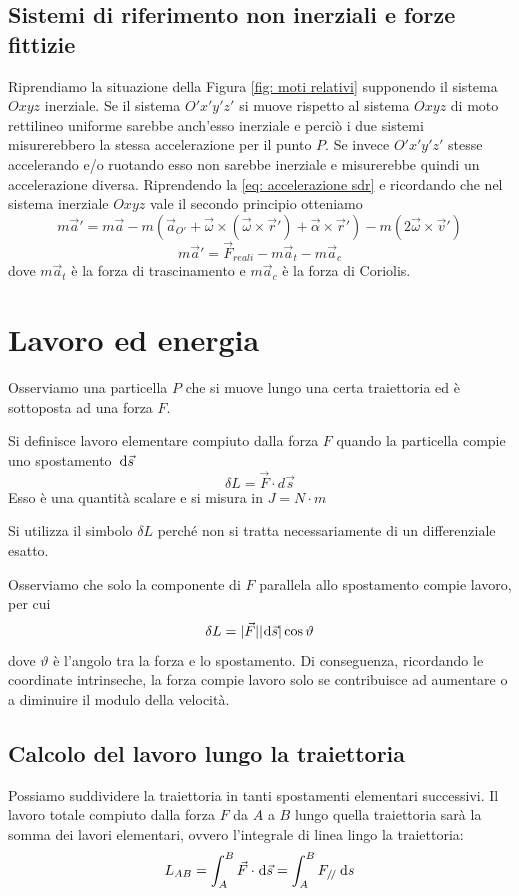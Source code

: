\documentclass{article}
\theoremstyle{plain}
\begin{document}
\subsection{Sistemi di riferimento non inerziali e forze fittizie}
Riprendiamo la situazione della Figura \ref{fig: moti relativi} supponendo il sistema $Oxyz$ inerziale. Se il sistema $O'x'y'z'$ si muove rispetto al sistema $Oxyz$ di moto rettilineo uniforme sarebbe anch'esso inerziale e perciò i due sistemi misurerebbero la stessa accelerazione per il punto $P$. Se invece $O'x'y'z'$ stesse accelerando e/o ruotando esso non sarebbe inerziale e misurerebbe quindi un accelerazione diversa. Riprendendo la \eqref{eq: accelerazione sdr} e ricordando che nel sistema inerziale $Oxyz$ vale il secondo principio otteniamo
\[m\vec a'=m\vec a-m\left(\vec a_{O'}+\vec \omega\times \left( \vec\omega  \times \vec r '\right)+\vec \alpha\times  \vec r'\right)-m\left(2\vec \omega \times \vec v'\right)\]
\begin{equation}m\vec a'=\vec F_{reali}-m\vec a_t-m\vec a_c\end{equation}
dove $m\vec a_t$ è la forza di trascinamento e $m\vec a_c$ è la forza di Coriolis.
\section{Lavoro ed energia}
Osserviamo una particella $P$ che si muove lungo una certa traiettoria ed è sottoposta ad una forza $F$. 
\begin{boxdef}
    Si definisce lavoro elementare compiuto dalla forza $F$ quando la particella compie uno spostamento $\:\text{d} \vec s$ 
    \[\delta L=\vec F\cdot d \vec s\]
    Esso è una quantità scalare e si misura in $J=N\cdot m$
\end{boxdef}
Si utilizza il simbolo $\delta L$ perché non si tratta necessariamente di un differenziale esatto. 

Osserviamo che solo la componente di $F$ parallela allo spostamento compie lavoro, per cui 
\[\delta L=|\vec F||\!\:\text{d} \vec s|\cos \vartheta\]
dove $\vartheta$ è l'angolo tra la forza e lo spostamento. Di conseguenza, ricordando le coordinate intrinseche, la forza compie lavoro solo se contribuisce ad aumentare o a diminuire il modulo della velocità.
\subsection{Calcolo del lavoro lungo la traiettoria}
Possiamo suddividere la traiettoria in tanti spostamenti elementari successivi. Il lavoro totale compiuto dalla forza $F$ da $A$ a $B$ lungo quella traiettoria sarà la somma dei lavori elementari, ovvero l'integrale di linea lingo la traiettoria:
\[L_{AB}=\int_A^B\vec F\cdot\!\:\text{d} \vec s=\int_A^B F_{/\!/} \:\text{d} s\]
\end{document}
